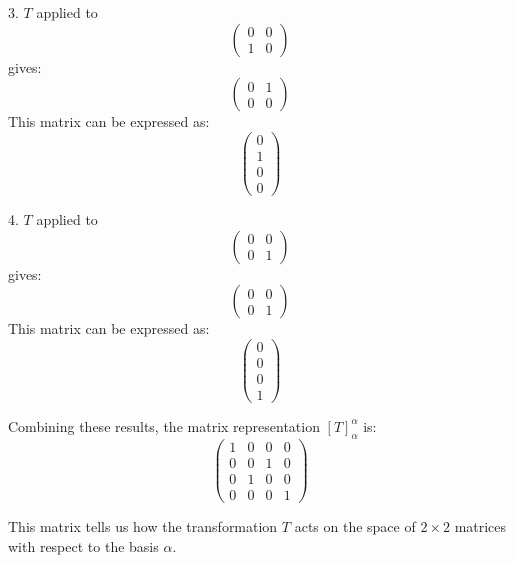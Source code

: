 \documentclass{article}
\begin{document}
	3. \( T \) applied to 
	\[
	\begin{pmatrix}
		0 & 0 \\
		1 & 0
	\end{pmatrix}
	\]
	gives:
	\[
	\begin{pmatrix}
		0 & 1 \\
		0 & 0
	\end{pmatrix}
	\]
	This matrix can be expressed as:
	\[ \begin{pmatrix}
		0 \\
		1 \\
		0 \\
		0
	\end{pmatrix} \]
	
	4. \( T \) applied to 
	\[
	\begin{pmatrix}
		0 & 0 \\
		0 & 1
	\end{pmatrix}
	\]
	gives:
	\[
	\begin{pmatrix}
		0 & 0 \\
		0 & 1
	\end{pmatrix}
	\]
	This matrix can be expressed as:
	\[ \begin{pmatrix}
		0 \\
		0 \\
		0 \\
		1
	\end{pmatrix} \]
	
	Combining these results, the matrix representation \([T]_{\alpha}^{\alpha}\) is:
	\[ 
	\begin{pmatrix}
		1 & 0 & 0 & 0 \\
		0 & 0 & 1 & 0 \\
		0 & 1 & 0 & 0 \\
		0 & 0 & 0 & 1
	\end{pmatrix}
	\]
	
	This matrix tells us how the transformation \( T \) acts on the space of \( 2 \times 2 \) matrices with respect to the basis \( \alpha \).
	
\end{document}

